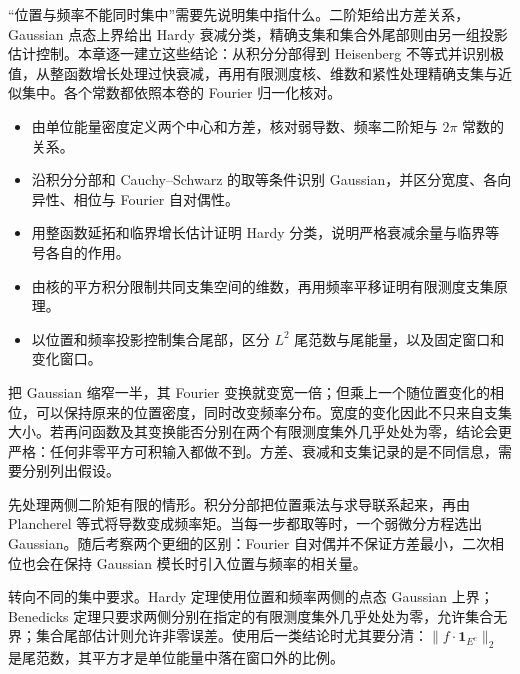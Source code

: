 \begin{chapterabstract}
“位置与频率不能同时集中”需要先说明集中指什么。二阶矩给出方差关系，Gaussian 点态上界给出 Hardy 衰减分类，精确支集和集合外尾部则由另一组投影估计控制。本章逐一建立这些结论：从积分分部得到 Heisenberg 不等式并识别极值，从整函数增长处理过快衰减，再用有限测度核、维数和紧性处理精确支集与近似集中。各个常数都依照本卷的 Fourier 归一化核对。
\end{chapterabstract}

\begin{learninggoals}\begin{itemize}
\item\label{b2:item:20-goal-1}由单位能量密度定义两个中心和方差，核对弱导数、频率二阶矩与 \(2\pi\) 常数的关系。
\item\label{b2:item:20-goal-2}沿积分分部和 Cauchy--Schwarz 的取等条件识别 Gaussian，并区分宽度、各向异性、相位与 Fourier 自对偶性。
\item\label{b2:item:20-goal-3}用整函数延拓和临界增长估计证明 Hardy 分类，说明严格衰减余量与临界等号各自的作用。
\item\label{b2:item:20-goal-4}由核的平方积分限制共同支集空间的维数，再用频率平移证明有限测度支集原理。
\item\label{b2:item:20-goal-5}以位置和频率投影控制集合尾部，区分 \(L^2\) 尾范数与尾能量，以及固定窗口和变化窗口。
\end{itemize}\end{learninggoals}

把 Gaussian 缩窄一半，其 Fourier 变换就变宽一倍；但乘上一个随位置变化的相位，可以保持原来的位置密度，同时改变频率分布。宽度的变化因此不只来自支集大小。若再问函数及其变换能否分别在两个有限测度集外几乎处处为零，结论会更严格：任何非零平方可积输入都做不到。方差、衰减和支集记录的是不同信息，需要分别列出假设。

\ProseParagraphBreak

先处理两侧二阶矩有限的情形。积分分部把位置乘法与求导联系起来，再由 Plancherel 等式将导数变成频率矩。当每一步都取等时，一个弱微分方程选出 Gaussian。随后考察两个更细的区别：Fourier 自对偶并不保证方差最小，二次相位也会在保持 Gaussian 模长时引入位置与频率的相关量。

\ProseParagraphBreak

转向不同的集中要求。Hardy 定理使用位置和频率两侧的点态 Gaussian 上界；Benedicks 定理只要求两侧分别在指定的有限测度集外几乎处处为零，允许集合无界；集合尾部估计则允许非零误差。使用后一类结论时尤其要分清：\(\|f\cdot\mathbf1_{E^c}\|_2\) 是尾范数，其平方才是单位能量中落在窗口外的比例。

